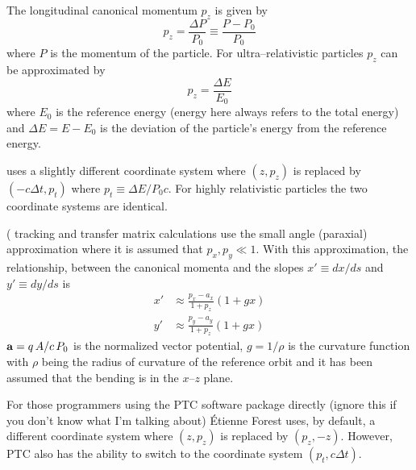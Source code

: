 The longitudinal canonical momentum $p_z$ is given by
\begin{equation}
  p_z = \frac{\Delta P}{P_0} \equiv \frac{P - P_0}{P_0}
\end{equation}
where $P$ is the momentum of the particle. For ultra--relativistic particles
$p_z$ can be approximated by
\begin{equation}
  p_z = \frac{\Delta E}{E_0}
\end{equation}
where $E_0$ is the reference energy (energy here always refers to the
total energy) and $\Delta E = E - E_0$ is the deviation of the
particle's energy from the reference energy. 

\mad uses a slightly different coordinate system where $(z, p_z)$ is
replaced by $(-c\Delta t, p_t)$ where $p_t \equiv \Delta E / P_0
c$. For highly relativistic particles the two coordinate systems are
identical.

 ( tracking and transfer matrix calculations
use the small angle (paraxial) approximation
where it is assumed that $p_x, p_y \ll 1$. With this approximation, the
relationship, between the canonical momenta and the slopes $x' \equiv dx/ds$
and $y' \equiv dy/ds$ is
\begin{align}
  x' &\approx \frac{p_x - a_x}{1 + p_z} (1 + g x) \\
  y' &\approx \frac{p_y - a_y}{1 + p_z} (1 + g x) 
  \label{xpa1p}
\end{align}
${\bf a} = q \, A / c \, P_0$ is the normalized vector potential, $g =
1/\rho$ is the curvature function with $\rho$ being the radius of
curvature of the reference orbit and it has been assumed that the
bending is in the $x$--$z$ plane. 

For those programmers using the PTC
software package directly (ignore
this if you don't know what I'm talking about) \'Etienne Forest uses,
by default, a different coordinate system where $(z, p_z)$ is replaced
by $(p_z, -z)$. However, PTC also has the ability to switch to the
coordinate system $(p_t, c \Delta t)$.